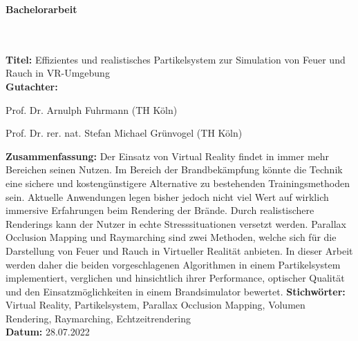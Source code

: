 \addtocounter{page}{1}

\begin{flushleft}
	\begin{huge}
		\textbf{Bachelorarbeit}
	\end{huge}
	~\\
	~\\
	\textbf{Titel:}  Effizientes und realistisches Partikelsystem zur Simulation von Feuer und Rauch in VR-Umgebung
	~\\
	\doublespacing
	\textbf{Gutachter:}
	\begin{description}
		\vspace{-0.2cm}
		\itemsep-8pt
		\item[–]
			Prof. Dr. Arnulph Fuhrmann (TH Köln)
		\item[–]
			Prof. Dr. rer. nat. Stefan Michael Grünvogel (TH Köln)
	\end{description}
	\vspace{-0.4cm}
	\singlespacing
	\textbf{Zusammenfassung:} Der Einsatz von Virtual Reality findet in immer mehr Bereichen
	seinen Nutzen. Im Bereich der Brandbekämpfung könnte die Technik eine sichere und
	kostengünstigere Alternative zu bestehenden Trainingsmethoden sein.
	Aktuelle Anwendungen legen bisher jedoch nicht viel Wert auf wirklich immersive Erfahrungen
	beim Rendering der Brände. Durch realistischere Renderings kann der Nutzer in echte Stresssituationen
	versetzt werden. Parallax Occlusion Mapping und Raymarching sind zwei Methoden, welche sich für die
	Darstellung von Feuer und Rauch in Virtueller Realität anbieten.
	In dieser Arbeit werden daher die beiden vorgeschlagenen Algorithmen in einem Partikelsystem implementiert, verglichen und
	hinsichtlich ihrer Performance, optischer Qualität und den Einsatzmöglichkeiten in einem Brandsimulator bewertet.
	\singlespacing
	\textbf{Stichwörter:} Virtual Reality, Partikelsystem, Parallax Occlusion Mapping, Volumen Rendering, Raymarching, Echtzeitrendering\\
	\doublespacing
	\textbf{Datum:} 28.07.2022


	\vspace{1cm}


\end{flushleft}
